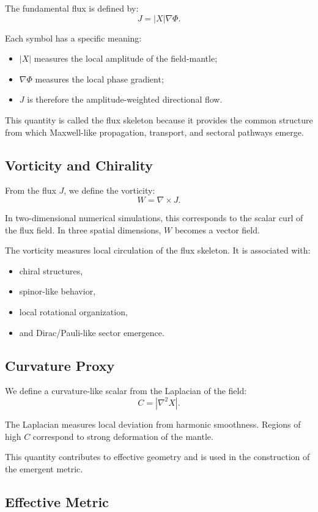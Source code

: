 \documentclass[11pt]{article}
\begin{document}
The fundamental flux is defined by:
\[
J = |X| \nabla \Phi.
\]

Each symbol has a specific meaning:
\begin{itemize}
\item $|X|$ measures the local amplitude of the field-mantle;
\item $\nabla \Phi$ measures the local phase gradient;
\item $J$ is therefore the amplitude-weighted directional flow.
\end{itemize}

This quantity is called the flux skeleton because it provides the common structure from which Maxwell-like propagation, transport, and sectoral pathways emerge.

\subsection{Vorticity and Chirality}

From the flux $J$, we define the vorticity:
\[
W = \nabla \times J.
\]

In two-dimensional numerical simulations, this corresponds to the scalar curl of the flux field. In three spatial dimensions, $W$ becomes a vector field.

The vorticity measures local circulation of the flux skeleton. It is associated with:
\begin{itemize}
\item chiral structures,
\item spinor-like behavior,
\item local rotational organization,
\item and Dirac/Pauli-like sector emergence.
\end{itemize}

\subsection{Curvature Proxy}

We define a curvature-like scalar from the Laplacian of the field:
\[
C = |\nabla^2 X|.
\]

The Laplacian measures local deviation from harmonic smoothness. Regions of high $C$ correspond to strong deformation of the mantle.

This quantity contributes to effective geometry and is used in the construction of the emergent metric.

\subsection{Effective Metric}
\end{document}
